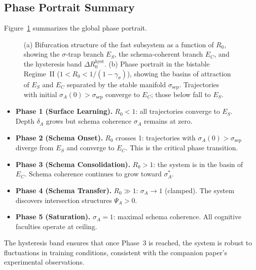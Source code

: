 \subsection{Phase Portrait Summary}

Figure~\ref{fig:phase-portrait} summarizes the global phase portrait.

\begin{figure}[t]
\centering

\caption{
  (a) Bifurcation structure of the fast subsystem as a function of $R_0$,
  showing the $\sigma$-trap branch $E_S$, the schema-coherent branch $E_C$,
  and the hysteresis band $\Delta R_0^{\mathrm{hyst}}$.
  (b) Phase portrait in the bistable Regime~II ($1 < R_0 < 1/(1-\gamma_\sigma)$),
  showing the basins of attraction of $E_S$ and $E_C$ separated by the
  stable manifold $\sigma_{\mathrm{sep}}$. Trajectories with initial
  $\sigma_A(0) > \sigma_{\mathrm{sep}}$ converge to $E_C$; those below
  fall to $E_S$.
}
\label{fig:phase-portrait}
\end{figure}

\begin{itemize}
\item \textbf{Phase 1 (Surface Learning).} $R_0 < 1$: all trajectories
  converge to $E_S$. Depth $\delta_A$ grows but schema coherence
  $\sigma_A$ remains at zero.
\item \textbf{Phase 2 (Schema Onset).} $R_0$ crosses 1: trajectories with
  $\sigma_A(0) > \sigma_{\mathrm{sep}}$ diverge from $E_S$ and converge
  to $E_C$. This is the critical phase transition.
\item \textbf{Phase 3 (Schema Consolidation).} $R_0 > 1$: the system is
  in the basin of $E_C$. Schema coherence continues to grow toward
  $\sigma^*_A$.
\item \textbf{Phase 4 (Schema Transfer).} $R_0 \gg 1$: $\sigma_A \to 1$
  (clamped). The system discovers intersection structures $\Psi_A > 0$.
\item \textbf{Phase 5 (Saturation).} $\sigma_A = 1$: maximal schema
  coherence. All cognitive faculties operate at ceiling.
\end{itemize}

The hysteresis band ensures that once Phase~3 is reached, the system
is robust to fluctuations in training conditions, consistent with the
companion paper's experimental observations.
